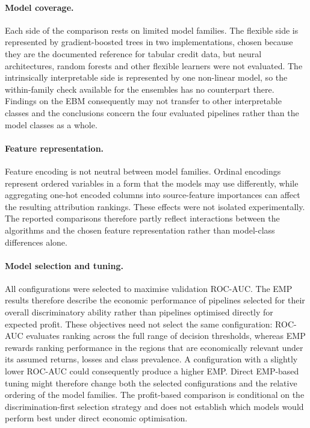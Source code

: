 \paragraph{Model coverage.}
Each side of the comparison rests on limited model families. The flexible side is
represented by gradient-boosted trees in two implementations, chosen because they are
the documented reference for tabular credit data, but neural architectures, random
forests and other flexible learners were not evaluated. The intrinsically interpretable
side is represented by one non-linear model, so the within-family check available for
the ensembles has no counterpart there. Findings on the EBM consequently may not transfer
to other interpretable classes and
the conclusions concern the four evaluated pipelines rather than the model classes as a
whole.

\paragraph{Feature representation.}
Feature encoding is not neutral between model families. Ordinal encodings represent
ordered variables in a form that the models may use differently, while aggregating
one-hot encoded columns into source-feature importances can affect the resulting
attribution rankings. These effects were not isolated experimentally. The reported
comparisons therefore partly reflect interactions between the algorithms and the
chosen feature representation rather than model-class differences alone.

\paragraph{Model selection and tuning.}
All configurations were selected to maximise validation ROC-AUC. The EMP results
therefore describe the economic performance of pipelines selected for their overall
discriminatory ability rather than pipelines optimised directly for expected profit.
These objectives need not select the same configuration: ROC-AUC evaluates ranking
across the full range of decision thresholds, whereas EMP rewards ranking performance
in the regions that are economically relevant under its assumed returns, losses and
class prevalence. A configuration with a slightly lower ROC-AUC could consequently
produce a higher EMP. Direct EMP-based tuning might therefore change
both the selected configurations and the relative ordering of the model families. The
profit-based comparison is conditional on the discrimination-first selection strategy
and does not establish which models would perform best under direct economic
optimisation.

